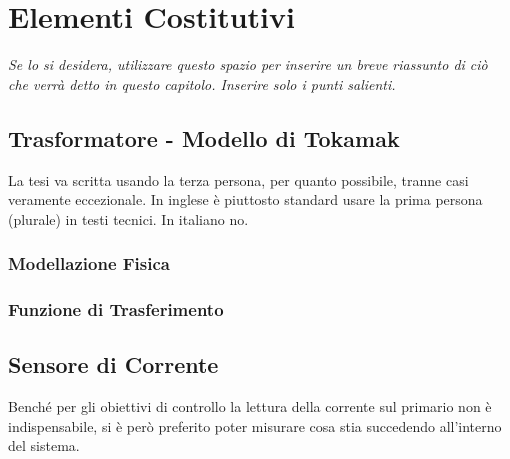\chapter{Elementi Costitutivi}\label{Hardware}

\begin{minipage}{12cm}\textit{Se lo si desidera, utilizzare questo spazio per inserire un breve riassunto di ci\`o che verr\`a detto in questo capitolo. Inserire solo i punti salienti.}
\end{minipage}

\vspace*{1cm}


\section{Trasformatore - Modello di Tokamak}\label{Trasformatore}

La tesi va scritta usando la terza persona, per quanto possibile, tranne casi veramente eccezionale. In inglese \`e piuttosto standard usare la prima persona (plurale) in testi tecnici. In italiano no.

\subsection{Modellazione Fisica}
\subsection{Funzione di Trasferimento}

\newpage


\section{Sensore di Corrente}\label{CurrentSense}
Benché per gli obiettivi di controllo la lettura della corrente sul primario non è indispensabile, si è però preferito poter misurare cosa stia succedendo all'interno del sistema.\\

